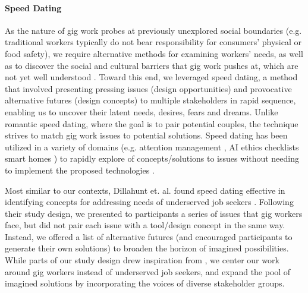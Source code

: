 \paragraph{Speed Dating}
As the nature of gig work probes at previously unexplored social boundaries (e.g. traditional workers typically do not bear responsibility for consumers' physical or food safety), we require alternative methods for examining workers' needs, as well as to discover the social and cultural barriers that gig work pushes at, which are not yet well understood \cite{Davidoff2007-fq,Zimmerman2017-rq}.
Toward this end, we leveraged speed dating, a method that involved presenting pressing issues (design opportunities) and provocative alternative futures (design concepts) to multiple stakeholders in rapid sequence, enabling us to uncover their latent needs, desires, fears and dreams. 
Unlike romantic speed dating, where the goal is to pair potential couples, the technique strives to match gig work issues to potential solutions. 
Speed dating has been utilized in a variety of domains (e.g. attention management \cite{chou2022because}, AI ethics checklists \cite{madaio2020co} smart homes \cite{jin2022exploring}) to rapidly explore of concepts/solutions to issues without needing to implement the proposed technologies \cite{Davidoff2007-fq}. 

Most similar to our contexts, Dillahunt et. al. found speed dating effective in identifying concepts for addressing needs of underserved job seekers \cite{Dillahunt2018-ia}. 
Following their study design, we presented to participants a series of issues that gig workers face, but did not pair each issue with a tool/design concept in the same way. 
Instead, we offered a list of alternative futures (and encouraged participants to generate their own solutions) to broaden the horizon of imagined possibilities. 
While parts of our study design drew inspiration from \cite{Dillahunt2018-ia}, we center our work around gig workers instead of underserved job seekers, and expand the pool of imagined solutions by incorporating the voices of diverse stakeholder groups. 

